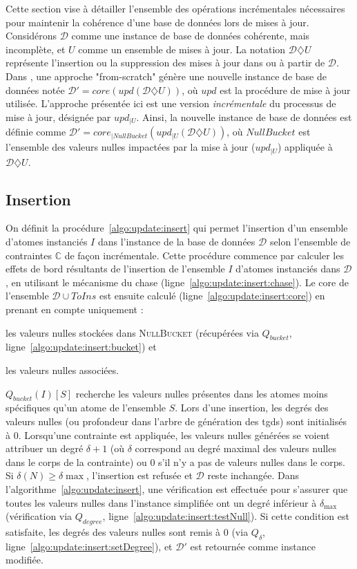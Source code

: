 Cette section vise à détailler l'ensemble des opérations incrémentales nécessaires pour maintenir la cohérence d'une base de données lors de mises à jour.
Considérons $\mathcal{D}$ comme une instance de base de données cohérente, mais incomplète, et $U$ comme un ensemble de mises à jour.
La notation $\mathcal{D} \diamondsuit U$ représente l'insertion ou la suppression des mises à jour dans ou à partir de $\mathcal{D}$.
Dans \cite{chabinConsistentUpdatingDatabases2020}, une approche "from-scratch" génère une nouvelle instance de base de données notée $\mathcal{D}' = core(upd(\mathcal{D} \diamondsuit U))$, où $upd$ est la procédure de mise à jour utilisée.
L'approche présentée ici est une version \textit{incrémentale} du processus de mise à jour, désignée par $upd_{|U}$.
Ainsi, la nouvelle instance de base de données est définie comme $\mathcal{D}' = core_{|NullBucket}(upd_{|U}(\mathcal{D}\diamondsuit U))$, où $NullBucket$ est l'ensemble des valeurs nulles impactées par la mise à jour ($upd_{|U}$) appliquée à $\mathcal{D} \diamondsuit U$.

\subsection{Insertion}
\label{sec:update:insert}
On définit la procédure~\ref{algo:update:insert} qui permet l'insertion d'un ensemble d'atomes instanciés $I$ dans l'instance de la base de données $\mathcal{D}$ selon l'ensemble de contraintes $\mathbb{C}$ de façon incrémentale.
Cette procédure commence par calculer les effets de bord résultants de l'insertion de l'ensemble $I$ d'atomes instanciés dans $\mathcal{D}$, en utilisant le mécanisme du \gls{chase} (ligne~\ref{algo:update:insert:chase}).
Le \gls{core} de l'ensemble $\mathcal{D} \cup ToIns$ est ensuite calculé (ligne~\ref{algo:update:insert:core}) en prenant en compte uniquement :
\begin{enumerate*}[label=(\alph*)]
    \item les valeurs nulles stockées dans \textsc{NullBucket} (récupérées via $Q_{bucket}$, ligne~\ref{algo:update:insert:bucket}) et
    \item les valeurs nulles associées.
\end{enumerate*}
$Q_{bucket}(I){[S]}$ recherche les valeurs nulles présentes dans les atomes moins spécifiques qu'un atome de l'ensemble $S$.
Lors d'une insertion, les degrés des valeurs nulles (ou profondeur dans l'arbre de génération des \glspl{tgd}) sont initialisés à 0.
Lorsqu'une contrainte est appliquée, les valeurs nulles générées se voient attribuer un degré $\delta + 1$ (où $\delta$ correspond au degré maximal des valeurs nulles dans le corps de la contrainte) ou 0 s'il n'y a pas de valeurs nulles dans le corps.
Si $\delta(N) \geq \delta{\max}$, l'insertion est refusée et $\mathcal{D}$ reste inchangée.
Dans l'algorithme~\ref{algo:update:insert}, une vérification est effectuée pour s'assurer que toutes les valeurs nulles dans l'instance simplifiée ont un degré inférieur à $\delta_{\max}$ (vérification via $Q_{degree}$, ligne~\ref{algo:update:insert:testNull}).
Si cette condition est satisfaite, les degrés des valeurs nulles sont remis à 0 (via $Q_{\delta}$, ligne~\ref{algo:update:insert:setDegree}), et $\mathcal{D}'$ est retournée comme instance modifiée.

